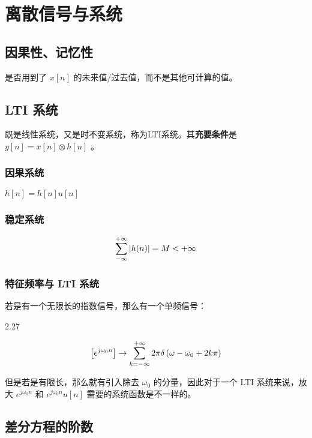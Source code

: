 \documentclass[cn,11pt,chinese,black,simple]{elegantbook}
\begin{document}
\fi 
\def\chapname{review}




\chapter{离散信号与系统}

\section{因果性、记忆性}

是否用到了 \(x[n]\) 的未来值/过去值，而不是其他可计算的值。

\section{LTI 系统}

既是线性系统，又是时不变系统，称为LTI系统。其\textbf{充要条件}是 \(y[n] = x[n] \otimes h[n]\) 。

\subsection{因果系统}

\(h[n] = h[n] u[n]\) 

\subsection{稳定系统}

\[
\displaystyle\sum_{-\infty}^{+\infty} |h(n)| =M<+\infty
\]

\subsection{特征频率与 LTI 系统}

若是有一个无限长的指数信号，那么有一个单频信号：

2.27

\[
    \left[e^{j \omega_{0} n}\right]\rightarrow \displaystyle\sum_{k=-\infty}^{+\infty} 2 \pi \delta\left(\omega-\omega_{0}+2 k \pi\right)
\]

但是若是有限长，那么就有引入除去 \(\omega_0\) 的分量，因此对于一个 LTI 系统来说，放大 \(e^{j \omega_0 n}\) 和 \(e^{j \omega_0 n} u[n]\) 需要的系统函数是不一样的。

\section{差分方程的阶数}
\end{document}
